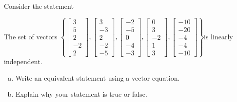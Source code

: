 
\begin{exerciseStatement}


Consider the statement 
\begin{center}\begin{minipage}{0.8\textwidth}
 The set of vectors \( \left\{ \left[\begin{array}{c}
3 \\
5 \\
2 \\
-2 \\
2
\end{array}\right] , \left[\begin{array}{c}
3 \\
-3 \\
2 \\
-2 \\
-5
\end{array}\right] , \left[\begin{array}{c}
-2 \\
-5 \\
0 \\
-4 \\
-3
\end{array}\right] , \left[\begin{array}{c}
0 \\
3 \\
-2 \\
1 \\
3
\end{array}\right] , \left[\begin{array}{c}
-10 \\
-20 \\
-4 \\
-4 \\
-10
\end{array}\right] \right\} \)is linearly independent.
\end{minipage}\end{center}
    


\begin{enumerate}[(a)]
\item  Write an equivalent statement using a vector equation.
\item  Explain why your statement is true or false.
\end{enumerate}
    
\end{exerciseStatement}
    
